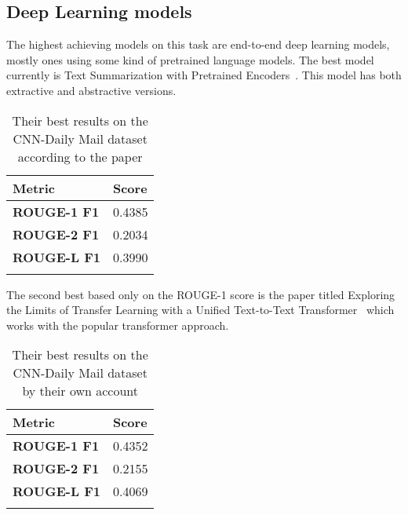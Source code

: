 \subsection{Deep Learning models}

The highest achieving models on this task are end-to-end deep learning models, mostly ones using some kind of pretrained language models.
The best model currently is Text Summarization with Pretrained Encoders~\cite{BERTsum}. This model has both extractive and abstractive versions.

\begin{longtable}{| l | l |}
	\hline 
	\textbf{Metric}&\textbf{Score} \\ \hline \hline
	\textbf{ROUGE-1 F1}&0.4385 \\ \hline
	\textbf{ROUGE-2 F1}&0.2034 \\ \hline
	\textbf{ROUGE-L F1}&0.3990 \\ \hline
	\caption{Their best results on the CNN-Daily Mail dataset according to the paper}
\end{longtable}

The second best based only on the ROUGE-1 score is the paper titled Exploring the Limits of Transfer Learning with a Unified Text-to-Text Transformer~\cite{TransferSum} which works with the popular transformer approach.

\begin{longtable}{| l | l |}
	\hline 
	\textbf{Metric}&\textbf{Score} \\ \hline \hline
	\textbf{ROUGE-1 F1}&0.4352 \\ \hline
	\textbf{ROUGE-2 F1}&0.2155 \\ \hline
	\textbf{ROUGE-L F1}&0.4069 \\ \hline
	\caption{Their best results on the CNN-Daily Mail dataset by their own account}
\end{longtable}
